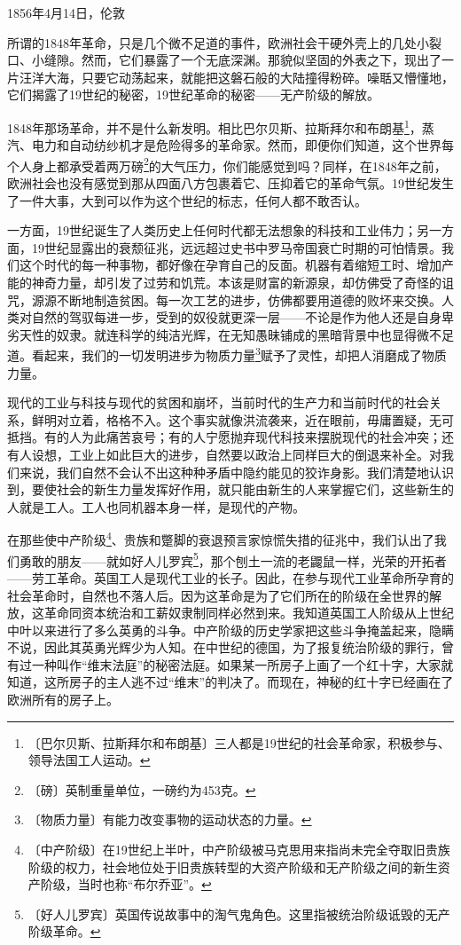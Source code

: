\documentclass[12pt,UTF-8,openany]{ctexbook}
\begin{document}
\begin{normalsize}
    
    \begin{center}1856年4月14日，伦敦\end{center}
    
    所谓的1848年革命，只是几个微不足道的事件，欧洲社会干硬外壳上的几处小裂口、小缝隙。然而，它们暴露了一个无底深渊。那貌似坚固的外表之下，现出了一片汪洋大海，只要它动荡起来，就能把这磐石般的大陆撞得粉碎。噪聒又懵懂地，它们揭露了19世纪的秘密，19世纪革命的秘密——无产阶级的解放。
    
    1848年那场革命，并不是什么新发明。相比巴尔贝斯、拉斯拜尔和布朗基\footnote{〔巴尔贝斯、拉斯拜尔和布朗基〕三人都是19世纪的社会革命家，积极参与、领导法国工人运动。}，蒸汽、电力和自动纺纱机才是危险得多的革命家。然而，即便你们知道，这个世界每个人身上都承受着两万磅\footnote{〔磅〕英制重量单位，一磅约为453克。}的大气压力，你们能感觉到吗？同样，在1848年之前，欧洲社会也没有感觉到那从四面八方包裹着它、压抑着它的革命气氛。19世纪发生了一件大事，大到可以作为这个世纪的标志，任何人都不敢否认。
    
    一方面，19世纪诞生了人类历史上任何时代都无法想象的科技和工业伟力；另一方面，19世纪显露出的衰颓征兆，远远超过史书中罗马帝国衰亡时期的可怕情景。我们这个时代的每一种事物，都好像在孕育自己的反面。机器有着缩短工时、增加产能的神奇力量，却引发了过劳和饥荒。本该是财富的新源泉，却仿佛受了奇怪的诅咒，源源不断地制造贫困。每一次工艺的进步，仿佛都要用道德的败坏来交换。人类对自然的驾驭每进一步，受到的奴役就更深一层——不论是作为他人还是自身卑劣天性的奴隶。就连科学的纯洁光辉，在无知愚昧铺成的黑暗背景中也显得微不足道。看起来，我们的一切发明进步为物质力量\footnote{〔物质力量〕有能力改变事物的运动状态的力量。}赋予了灵性，却把人消磨成了物质力量。
    
    现代的工业与科技与现代的贫困和崩坏，当前时代的生产力和当前时代的社会关系，鲜明对立着，格格不入。这个事实就像洪流袭来，近在眼前，毋庸置疑，无可抵挡。有的人为此痛苦哀号；有的人宁愿抛弃现代科技来摆脱现代的社会冲突；还有人设想，工业上如此巨大的进步，自然要以政治上同样巨大的倒退来补全。对我们来说，我们自然不会认不出这种种矛盾中隐约能见的狡诈身影。我们清楚地认识到，要使社会的新生力量发挥好作用，就只能由新生的人来掌握它们，这些新生的人就是工人。工人也同机器本身一样，是现代的产物。
    
    在那些使中产阶级\footnote{〔中产阶级〕在19世纪上半叶，中产阶级被马克思用来指尚未完全夺取旧贵族阶级的权力，社会地位处于旧贵族转型的大资产阶级和无产阶级之间的新生资产阶级，当时也称“布尔乔亚”。}、贵族和蹩脚的衰退预言家惊慌失措的征兆中，我们认出了我们勇敢的朋友——就如好人儿罗宾\footnote{〔好人儿罗宾〕英国传说故事中的淘气鬼角色。这里指被统治阶级诋毁的无产阶级革命。}，那个刨土一流的老鼹鼠一样，光荣的开拓者——劳工革命。英国工人是现代工业的长子。因此，在参与现代工业革命所孕育的社会革命时，自然也不落人后。因为这革命是为了它们所在的阶级在全世界的解放，这革命同资本统治和工薪奴隶制同样必然到来。我知道英国工人阶级从上世纪中叶以来进行了多么英勇的斗争。中产阶级的历史学家把这些斗争掩盖起来，隐瞒不说，因此其英勇光辉少为人知。在中世纪的德国，为了报复统治阶级的罪行，曾有过一种叫作“维末法庭”的秘密法庭。如果某一所房子上画了一个红十字，大家就知道，这所房子的主人逃不过“维末”的判决了。而现在，神秘的红十字已经画在了欧洲所有的房子上。
    

\end{normalsize}
\end{document}
